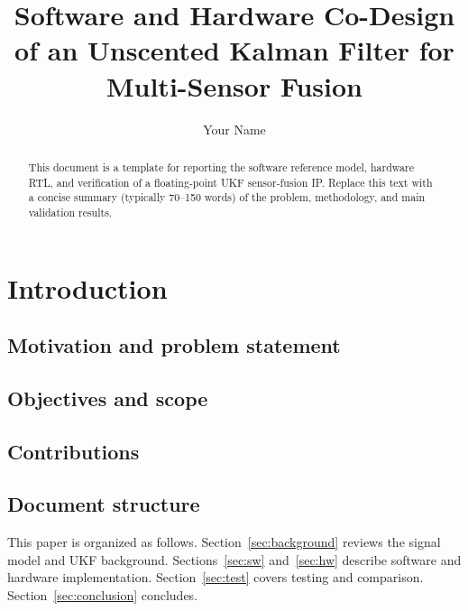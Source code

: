 \documentclass{svproc}
\begin{document}
\mainmatter

\title{Software and Hardware Co-Design of an Unscented Kalman Filter for Multi-Sensor Fusion}

\author{Your Name}


\maketitle

\begin{abstract}
This document is a template for reporting the software reference model, hardware RTL, and verification of a floating-point UKF sensor-fusion IP. Replace this text with a concise summary (typically 70--150 words) of the problem, methodology, and main validation results.
\end{abstract}

\section{Introduction}
\label{sec:intro}

\subsection{Motivation and problem statement}

\subsection{Objectives and scope}

\subsection{Contributions}

\subsection{Document structure}
This paper is organized as follows. Section~\ref{sec:background} reviews the signal model and UKF background. Sections~\ref{sec:sw} and~\ref{sec:hw} describe software and hardware implementation. Section~\ref{sec:test} covers testing and comparison. Section~\ref{sec:conclusion} concludes.
\end{document}
